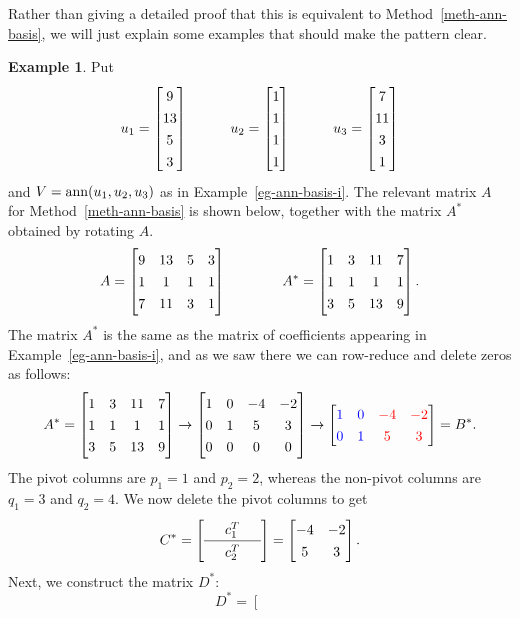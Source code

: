 \documentclass[reqno]{amsart}
\theoremstyle{definition}
\newtheorem{example}[theorem]{Example}
\begin{document}
Rather than giving a detailed proof that this is equivalent to
Method~\ref{meth-ann-basis}, we will just explain some examples that
should make the pattern clear.

\begin{example}\label{eg-ann-basis-matrix-i}
 Put
 \[ u_1 = \bbm 9\\ 13\\ 5\\ 3\ebm \hspace{3em}
    u_2 = \bbm 1\\  1\\ 1\\ 1\ebm \hspace{3em}
    u_3 = \bbm 7\\ 11\\ 3\\ 1\ebm
 \]
 and $V=\operatorname{ann}(u_1,u_2,u_3)$ as in Example~\ref{eg-ann-basis-i}.  The
 relevant matrix $A$ for Method~\ref{meth-ann-basis} is shown below,
 together with the matrix $A^*$ obtained by rotating $A$.
 \[ A = \bbm 9&13&5&3 \\ 1&1&1&1 \\ 7&11&3&1 \ebm
    \hspace{4em}
    A^* = \bbm 1&3&11&7 \\ 1&1&1&1 \\ 3&5&13&9 \ebm.
 \]
 The matrix $A^*$ is the same as the matrix of coefficients appearing
 in Example~\ref{eg-ann-basis-i}, and as we saw there we can
 row-reduce and delete zeros as follows:
 \[ A^* = \bbm 1&3&11&7 \\ 1&1&1&1 \\ 3&5&13&9 \ebm
     \to
     \bbm 1&0&-4&-2 \\ 0&1&5&3 \\ 0&0&0&0 \ebm
     \to
     \bbm \BLUE{1}&\BLUE{0}&\RED{-4}&\RED{-2} \\
          \BLUE{0}&\BLUE{1}&\RED{5}&\RED{3} \ebm
     = B^*.
 \]
 The pivot columns are $p_1=1$ and $p_2=2$, whereas the non-pivot
 columns are $q_1=3$ and $q_2=4$.  We now delete the pivot columns to
 get
 \[ C^* = {\renewcommand{\arraystretch}{1.3}
      \left[\begin{array}{ccc}
       & c_1^T & \\ \hline
       & c_2^T &
      \end{array}\right]}
       = \bbm -4 & -2 \\ 5 & 3 \ebm.
 \]
 Next, we construct the matrix $D^*$:
 \[ D^* =
      \left[\begin{array}{c|c|c|c}
        &&& \\

\end{array}\]
\end{example}
\end{document}
